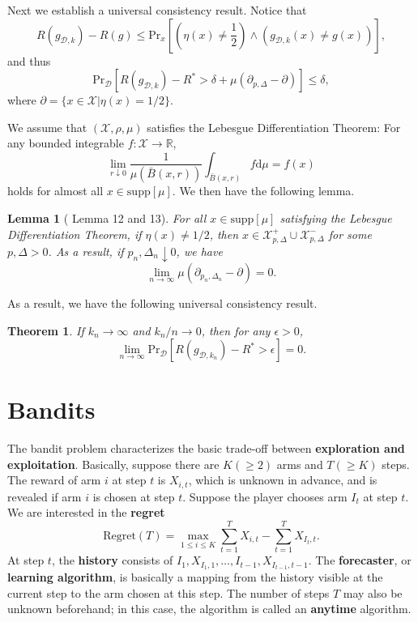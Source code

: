 \documentclass[openany]{book}
\newtheorem{lemma}{Lemma}[chapter]
\newtheorem{theorem}{Theorem}[chapter]
\theoremstyle{definition}
\theoremstyle{remark}
\begin{document}
Next we establish a universal consistency result. Notice that
\begin{equation*}
    R(g_{\mathcal{D},k})-R(g)\le \mathrm{Pr}_x\left[\left(\eta(x)\ne \frac{1}{2}\right)\wedge(g_{\mathcal{D},k}(x)\ne g(x))\right],
\end{equation*}
and thus
\begin{equation*}
    \mathrm{Pr}_{\mathcal{D}}\left[R(g_{\mathcal{D},k})-R^*>\delta+\mu(\partial_{p,\Delta}\!-\partial)\right]\le\delta,
\end{equation*}
where $\partial=\{x\in \mathcal{X}|\eta(x)=1/2\}$.

We assume that $(\mathcal{X},\rho,\mu)$ satisfies the Lebesgue Differentiation Theorem: For any bounded integrable $f:\mathcal{X}\to \mathbb{R}$,
\begin{equation*}
    \lim_{r\downarrow0}\frac{1}{\mu(\bar{B}(x,r))}\int_{\bar{B}(x,r)}f \mathrm{d}\mu=f(x)
\end{equation*}
holds for almost all $x\in \mathrm{supp}[\mu]$. We then have the following lemma.
\begin{lemma}[\cite{CD14} Lemma 12 and 13]
    For all $x\in \mathrm{supp}[\mu]$ satisfying the Lebesgue Differentiation Theorem, if $\eta(x)\ne1/2$, then $x\in \mathcal{X}_{p,\Delta}^+\cup \mathcal{X}_{p,\Delta}^-$ for some $p,\Delta>0$. As a result, if $p_n,\Delta_n\downarrow0$, we have
    \begin{equation*}
        \lim_{n\to\infty}\mu(\partial_{p_n,\Delta_n}\!-\partial)=0.
    \end{equation*}
\end{lemma}
As a result, we have the following universal consistency result.
\begin{theorem}
    If $k_n\to\infty$ and $k_n/n\to0$, then for any $\epsilon>0$,
    \begin{equation*}
        \lim_{n\to\infty}\mathrm{Pr}_{\mathcal{D}}[R(g_{\mathcal{D},k_n})-R^*>\epsilon]=0.
    \end{equation*}
\end{theorem}

\part{Bandits}
The bandit problem characterizes the basic trade-off between \textbf{exploration and exploitation}. Basically, suppose there are $K(\ge2)$ arms and $T(\ge K)$ steps. The reward of arm $i$ at step $t$ is $X_{i,t}$, which is unknown in advance, and is revealed if arm $i$ is chosen at step $t$. Suppose the player chooses arm $I_t$ at step $t$. We are interested in the \textbf{regret}
\begin{equation}\label{regret}
    \mathrm{Regret}(T)=\max_{1\le i\le K}\sum_{t=1}^{T}X_{i,t}-\sum_{t=1}^{T}X_{I_t,t}.
\end{equation}
At step $t$, the \textbf{history} consists of $I_1,X_{I_1,1},\ldots,I_{t-1},X_{I_{t-1},t-1}$. The \textbf{forecaster}, or \textbf{learning algorithm}, is basically a mapping from the history visible at the current step to the arm chosen at this step. The number of steps $T$ may also be unknown beforehand; in this case, the algorithm is called an \textbf{anytime} algorithm.
\end{document}
